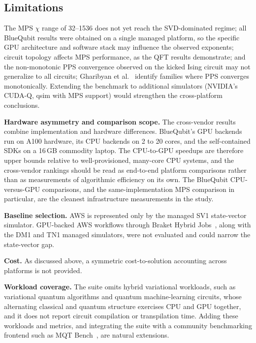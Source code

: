 \documentclass[conference,10pt]{IEEEtran}
\begin{document}
\subsection{Limitations}

The MPS $\chi$ range of 32--1536 does not yet reach the SVD-dominated regime; all BlueQubit results were obtained on a single managed platform, so the specific GPU architecture and software stack may influence the observed exponents; circuit topology affects MPS performance, as the QFT results demonstrate; and the non-monotonic PPS convergence observed on the kicked Ising circuit may not generalize to all circuits; Gharibyan et al.~\cite{gharibyan2025practical} identify families where PPS converges monotonically. Extending the benchmark to additional simulators (NVIDIA's CUDA-Q, qsim with MPS support) would strengthen the cross-platform conclusions.

\textbf{Hardware asymmetry and comparison scope.} The cross-vendor results combine implementation and hardware differences. BlueQubit's GPU backends run on A100 hardware, its CPU backends on 2 to 20 cores, and the self-contained SDKs on a 16\,GB commodity laptop. The CPU-to-GPU speedups are therefore upper bounds relative to well-provisioned, many-core CPU systems, and the cross-vendor rankings should be read as end-to-end platform comparisons rather than as measurements of algorithmic efficiency on its own. The BlueQubit CPU-versus-GPU comparisons, and the same-implementation MPS comparison in particular, are the cleanest infrastructure measurements in the study.

\textbf{Baseline selection.} AWS is represented only by the managed SV1 state-vector simulator. GPU-backed AWS workflows through Braket Hybrid Jobs~\cite{braket_jobs}, along with the DM1 and TN1 managed simulators, were not evaluated and could narrow the state-vector gap.

\textbf{Cost.} As discussed above, a symmetric cost-to-solution accounting across platforms is not provided.

\textbf{Workload coverage.} The suite omits hybrid variational workloads, such as variational quantum algorithms and quantum machine-learning circuits, whose alternating classical and quantum structure exercises CPU and GPU together, and it does not report circuit compilation or transpilation time. Adding these workloads and metrics, and integrating the suite with a community benchmarking frontend such as MQT Bench~\cite{quetschlich2023mqtbench}, are natural extensions.
\end{document}
